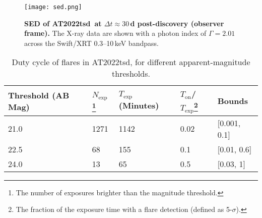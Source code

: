 \documentclass{nature_plusfigure}
\newcommand{\at}{AT2022tsd}
\begin{document}
\begin{extended_data}

\begin{figure}[!ht]
 \centering
\texttt{[image: sed.png]}
  \caption{\textbf{SED of \at\ at $\Delta t\approx30\,$d post-discovery (observer frame).} The X-ray data are shown with a photon index of $\Gamma=2.01$ across the Swift/XRT 0.3--10\,keV bandpass.}
 \label{fig:full-sed}
\end{figure}

\begin{center} 
\begin{longtable}{lllll}
\caption{Duty cycle of flares in \at, for different apparent-magnitude thresholds.} 
\label{tab:flare-stats}\\ 
\hline\hline
Threshold (AB Mag) & $N_\mathrm{exp}$\footnote{The number of exposures brighter than the magnitude threshold.} & $T_\mathrm{exp}$ (Minutes) & $T_\mathrm{on}$/$T_\mathrm{exp}$\footnote{The fraction of the exposure time with a flare detection (defined as 5-$\sigma$).} & Bounds \\
\hline
21.0 & 1271 & 1142 & 0.02 & [0.001, 0.1] \\
22.5 & 68 & 155 & 0.1 & [0.01, 0.6]  \\
24.0 & 13 & 65 & 0.5 & [0.03, 1] \\
\hline \hline
\end{longtable}
\end{center}

\end{extended_data}

\clearpage
\end{document}
